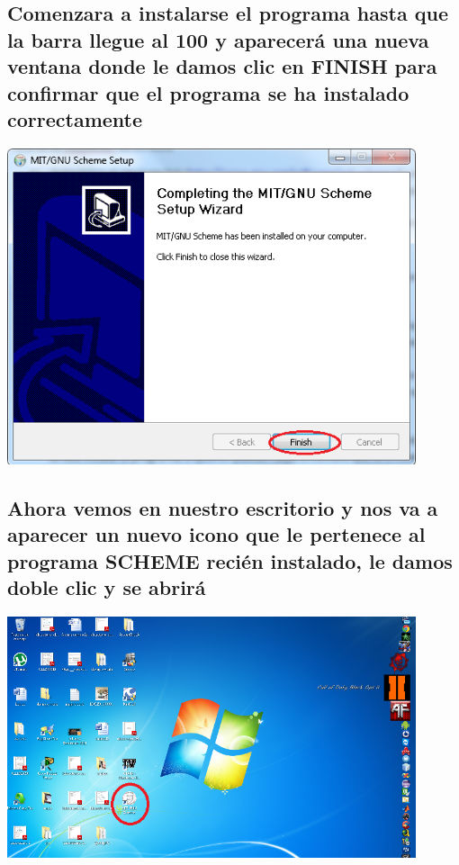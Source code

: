 \documentclass[11pt]{article} %
\begin{document}
\subsection{Comenzara a instalarse el programa hasta que la barra llegue al 100 y aparecerá una nueva ventana donde le damos clic en FINISH para confirmar que el programa se ha instalado correctamente}
\begin{center}
\includegraphics[width=12cm]{6.png}
\end{center}

\subsection{Ahora vemos en nuestro escritorio y nos va a aparecer un nuevo icono que le pertenece al programa SCHEME recién instalado, le damos doble clic y se abrirá}
\begin{center}
\includegraphics[width=12cm]{7.png}
\end{center}
\end{document}
